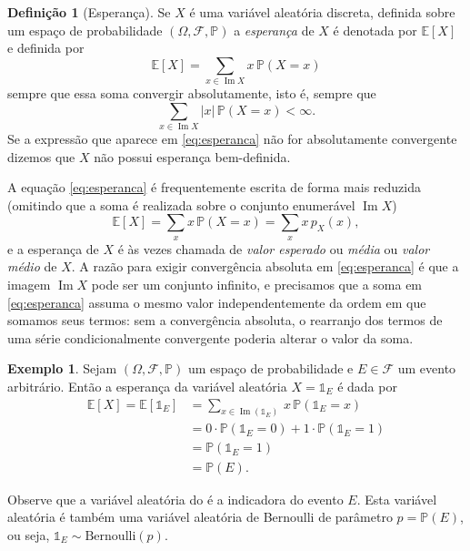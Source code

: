 \documentclass[12pt,portuguese]{article}
\theoremstyle{definition}
\newtheorem{definition}[definition]{Definição}
\newtheorem{example}[example]{Exemplo}
\begin{document}
\begin{definition}[Esperança]\label{def:esperanca}
Se \(X\) é uma variável aleatória discreta,
definida sobre um espaço de probabilidade $(\Omega,\mathcal{F},\mathbb{P})$ 
a \emph{esperança} de \(X\) é denotada por \(\mathbb{E}[X]\) e definida por
\begin{equation}\label{eq:esperanca}
\mathbb{E}[X] = \sum_{x \in \operatorname{Im} X} x \, \mathbb{P}(X = x)
\end{equation}
sempre que essa soma convergir absolutamente, isto é, sempre que
\[
\sum_{x \in \operatorname{Im} X} |x|\, \mathbb{P}(X = x) < \infty.
\]
Se a expressão que aparece em \eqref{eq:esperanca} não for absolutamente convergente
dizemos que $X$ não possui esperança bem-definida.
\end{definition}

A equação \eqref{eq:esperanca} é frequentemente escrita de forma mais reduzida (omitindo que a soma é realizada sobre
o conjunto enumerável $\operatorname{Im} X$)
\[
\mathbb{E}[X] = \sum_{x} x \, \mathbb{P}(X = x) = \sum_{x} x \, p_X(x),
\]
e a esperança de \(X\) é às vezes chamada de \emph{valor esperado} ou
\emph{média} ou \emph{valor médio} de \(X\). A razão para exigir convergência absoluta em
\eqref{eq:esperanca} é que a imagem \(\operatorname{Im} X\) pode ser um
conjunto infinito, e precisamos que a soma em \eqref{eq:esperanca} assuma o
mesmo valor independentemente da ordem em que somamos seus termos: sem a
convergência absoluta, o rearranjo dos termos de uma série condicionalmente
convergente poderia alterar o valor da soma.

\begin{example}\label{exemplo-esp-indicadora}
Sejam $(\Omega,\mathcal{F},\mathbb{P})$ um espaço de probabilidade e $E\in\mathcal{F}$ um evento arbitrário.
Então a esperança da variável aleatória $X=\mathds{1}_{E}$ é dada por 
\begin{align*}
\mathbb{E}[X] 
= 
\mathbb{E}[\mathds{1}_{E}] 
&= 
\sum_{x\in \operatorname{Im}(\mathds{1}_{E})}\, x\, \mathbb{P}(\mathds{1}_{E}=x)
\\[0.3cm]
&=
0\cdot \mathbb{P}(\mathds{1}_{E}=0) + 1\cdot \mathbb{P}(\mathds{1}_{E}=1)
\\[0.3cm]
&=
\mathbb{P}(\mathds{1}_{E}=1)
\\[0.3cm]
&=
\mathbb{P}(E).
\end{align*}
\end{example}

Observe que a variável aleatória do  é a indicadora do evento $E$.
Esta variável aleatória é também uma variável aleatória
de Bernoulli de parâmetro $p=\mathbb{P}(E)$, ou seja, 
$\mathds{1}_{E}\sim \mathrm{Bernoulli}(p)$.
\end{document}
